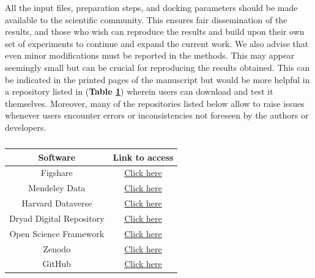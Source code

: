 All the input files, preparation steps, and docking parameters should be made available to the scientific community. This ensures fair dissemination of the results, and those who wish can reproduce the results and build upon their own set of experiments to continue and expand the current work. We also advise that even minor modifications must be reported in the methods. This may appear seemingly small but can be crucial for reproducing the results obtained. This can be indicated in the printed pages of the manuscript but would be more helpful in a repository listed in (\textbf{Table \ref{tab:list3}}) wherein users can download and test it themselves. Moreover, many of the repositories listed below allow to raise issues whenever users encounter errors or inconsistencies not foreseen by the authors or developers. 

\begin{table}[ht]
    \centering 
    \caption{{\color{red}{List of repositories for share files in the public domain}}}
    \label{tab:list3}
    \begin{tabular}{|c|c|}
    \hline
         \textbf{Software} &  \textbf{Link to access} \\
    \hline
        Figshare &  \href{https://figshare.com/}{Click here} \\
        Mendeley Data &  \href{https://data.mendeley.com/}{Click here}  \\
        Harvard Dataverse &  \href{https://dataverse.harvard.edu/}{Click here}  \\
        Dryad Digital Repository & \href{https://datadryad.org/stash}{Click here} \\
        Open Science Framework &  \href{https://osf.io/}{Click here}  \\
        Zenodo & \href{https://zenodo.org/}{Click here} \\
        GitHub & \href{https://github.com/}{Click here} \\
    \hline
    \end{tabular}
\end{table}


%

